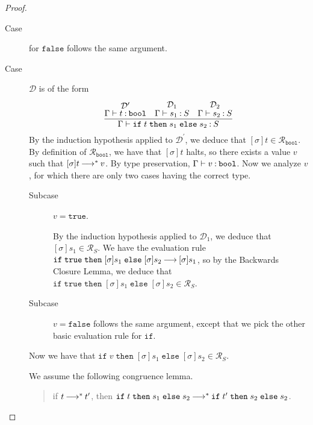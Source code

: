 \documentclass[11pt,letterpaper]{article}
\renewcommand{\R}{\mathcal{R}}
\newcommand{\bool}{\mathtt{bool}}
\newcommand{\True}{\mathtt{true}}
\newcommand{\False}{\mathtt{false}}
\newcommand{\ifthenelse}[3]{%
  \mathtt{if}\;#1\;\mathtt{then}\;#2\;\mathtt{else}\;#3%
}
\begin{document}
\begin{enumerate}
\begin{proof}
\begin{description}
        \item[Case] for $\False$ follows the same argument.

        \item[Case] $\mathcal{D}$ is of the form
          \begin{equation*}
            \infer{%
              \Gamma \proves \ifthenelse{t}{s_1}{s_2} \hastype S%
            }{%
              \deduce[\mathcal{D}^\prime]{\Gamma \proves t \hastype \bool}{}
              &
              \deduce[\mathcal{D}_1]{\Gamma \proves s_1 \hastype S}{}
              &
              \deduce[\mathcal{D}_2]{\Gamma \proves s_2 \hastype S}{}
            }
          \end{equation*}
          By the induction hypothesis applied to $\mathcal{D}^\prime$,
          we deduce that $[\sigma]t \in \R_\bool$.
          By definition of $\R_\bool$, we have that $[\sigma]t$ halts, so
          there exists a value $v$ such that $[\sigma]t \mathbin{\longrightarrow}^* v$.
          By type preservation, $\Gamma \proves v \hastype \bool$.
          Now we analyze $v$, for which there are only two cases having the
          correct type.
          \begin{description}
            \item[Subcase] $v = \True$.

              By the induction hypothesis applied to $\mathcal{D}_1$,
              we deduce that $[\sigma]s_1 \in \R_S$.
              We have the evaluation rule
              $\ifthenelse{\True}{[\sigma]s_1}{[\sigma]s_2} \evalto [\sigma]s_1$,
              so by the Backwards Closure Lemma,
              we deduce that
              $\ifthenelse{\True}{[\sigma]s_1}{[\sigma]s_2} \in \R_S$.

            \item[Subcase] $v = \False$ follows the same argument, except that
              we pick the other basic evaluation rule for $\mathtt{if}$.
          \end{description}
          Now we have that
          $\ifthenelse{v}{[\sigma]s_1}{[\sigma]s_2} \in \R_S$.

          We assume the following congruence lemma.
          \begin{quote}
            if $t \mathbin{\longrightarrow}^* t^\prime$, then
            $\ifthenelse{t}{s_1}{s_2}
            \evalto^* \ifthenelse{t^\prime}{s_2}{s_2}$.
          \end{quote}


\end{description}
\end{proof}
\end{enumerate}
\end{document}
